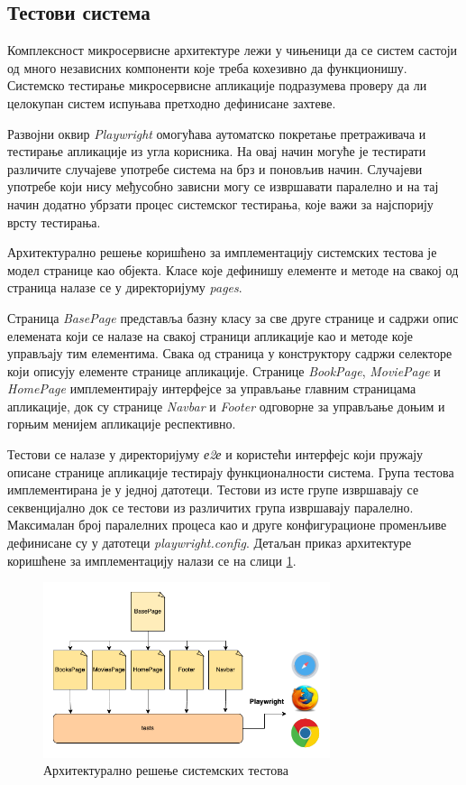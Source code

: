 \documentclass[12pt,oneside]{memoir}
\begin{document}
\subsection{Тестови система}

Комплексност микросервисне архитектуре лежи у чињеници да се систем састоји од много независних компоненти које треба кохезивно да функционишу. Системско тестирање микросервисне апликације подразумева проверу да ли целокупан систем испуњава претходно дефинисане захтеве.

Развојни оквир \textit{Playwright} омогућава аутоматско покретање претраживача и тестирање апликације из угла корисника. На овај начин могуће је тестирати различите случајеве употребе система на брз и поновљив начин. Случајеви употребе који нису међусобно зависни могу се извршавати паралелно и на тај начин додатно убрзати процес системског тестирања, које важи за најспорију врсту тестирања.

Архитектурално решење коришћено за имплементацију системских тестова  је модел странице као објекта. Класе које дефинишу елементе и методе на свакој од страница налазе се у директоријуму \textit{pages}. 

Страница \textit{BasePage} представља базну класу за све друге странице и садржи опис елемената који се налазе на свакој страници апликације као и методе које управљају тим елементима.  Свака од страница у конструктору садржи селекторе који описују елементе странице апликације. Странице \textit{BookPage}, \textit{MoviePage} и \textit{HomePage} имплементирају интерфејсе за управљање главним страницама апликације, док су странице \textit{Navbar} и \textit{Footer} одговорне за управљање доњим и горњим менијем апликације респективно.

Тестови се налазе у директоријуму \textit{е2е} и користећи интерфејс који пружају описане странице апликације тестирају функционалности система. Група тестова имплементирана је у једној датотеци. Тестови из исте групе извршавају се секвенцијално док се тестови из различитих група извршавају паралелно. Максималан број паралелних процеса као и друге конфигурационе променљиве дефинисане су у датотеци \textit{playwright.config}. Детаљан приказ архитектуре коришћене за имплементацију налази се на слици \ref{fig:arhitektura}.

\begin{figure}[!ht]
  \centering
  \includegraphics[width=0.75\textwidth]{matfmaster/img/arhitektura.png}
  \caption{Архитектурално решење системских тестова}
  \label{fig:arhitektura}
\end{figure}
\end{document}
